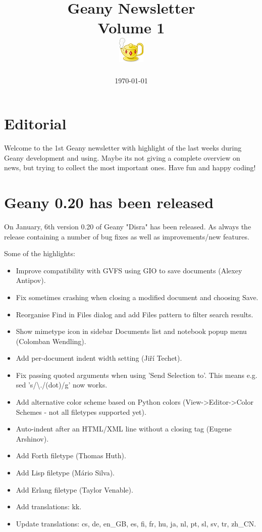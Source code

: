 \documentclass[%
paper=a4,%
fontsize=11pt,%
twoside=false,%
DIV18,
headsepline,
plainheadsepline,
footsepline,
plainfootsepline,
parskip=half,%
openany,%
]{scrartcl}
\title{Geany Newsletter \\[1ex]
	\small{Volume 1} \\[1ex]
	\includegraphics{img/geany.png}}
\date{\today}
\begin{document}
\maketitle{}
\tableofcontents{}

\section*{Editorial}

Welcome to the 1st Geany newsletter with highlight of the last weeks
during Geany development and using. Maybe its not giving a complete
overview on news, but trying to collect the most important ones.
Have fun and happy coding!

\newpage{}
\section{Geany 0.20 has been released}

On January, 6th version 0.20 of Geany "Disra" has been released. As always
the release containing a number of bug fixes as well as
improvements/new features.

Some of the highlights:

\begin{itemize}
	\item Improve compatibility with GVFS using GIO to save documents (Alexey Antipov).
	\item Fix sometimes crashing when closing a modified document and choosing Save.
	\item Reorganise Find in Files dialog and add Files pattern to filter search results.
	\item Show mimetype icon in sidebar Documents list and notebook popup menu (Colomban Wendling).
	\item Add per-document indent width setting (Jiří Techet).
	\item Fix passing quoted arguments when using 'Send Selection to'. This means e.g. sed 's/\textbackslash{}./(dot)/g' now works.
	\item Add alternative color scheme based on Python colors (View->Editor->Color Schemes - not all filetypes supported yet).
	\item Auto-indent after an HTML/XML line without a closing tag (Eugene Arshinov).
	\item Add Forth filetype (Thomas Huth).
	\item Add Lisp filetype (Mário Silva).
	\item Add Erlang filetype (Taylor Venable).
	\item Add translations: kk.
	\item Update translations: cs, de, en\_GB, es, fi, fr, hu, ja, nl, pt, sl, sv, tr, zh\_CN.
\end{itemize}
\end{document}
